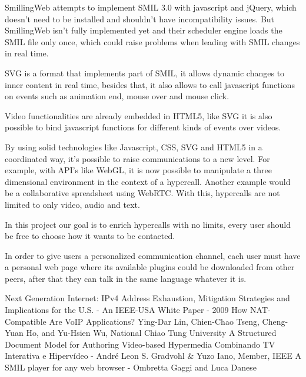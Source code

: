 \documentclass[11pt,twocolumn]{article}
\begin{document}
  SmillingWeb attempts to implement SMIL 3.0 with javascript and jQuery, which doesn't need to be installed and shouldn't have incompatibility issues. But SmillingWeb isn't fully implemented yet and their scheduler engine loads the SMIL file only once, which could raise problems when leading with SMIL changes in real time.  

  SVG is a format that implements part of SMIL, it allows dynamic changes to inner content in real time, besides that, it also allows to call javascript functions on events such as animation end, mouse over and mouse click.

  Video functionalities are already embedded in HTML5, like SVG it is also possible to bind javascript functions for different kinds of events over videos.

  By using solid technologies like Javascript, CSS, SVG and HTML5 in a coordinated way, it's possible to raise communications to a new level. For example, with API's like WebGL, it is now possible to manipulate a three dimensional environment in the context of a hypercall. Another example would be a collaborative spreadsheet using WebRTC. With this, hypercalls are not limited to only video, audio and text.

  In this project our goal is to enrich hypercalls with no limits, every user should be free to choose how it wants to be contacted.

  In order to give users a personalized communication channel, each user must have a personal web page where its available plugins could be downloaded from other peers, after that they can talk in the same language whatever it is.




\begin{thebibliography}{9}


 Next Generation Internet: IPv4 Address Exhaustion, Mitigation Strategies and Implications for the U.S. - An IEEE-USA White Paper - 2009
 How NAT-Compatible Are VoIP Applications? Ying-Dar Lin, Chien-Chao Tseng, Cheng-Yuan Ho, and Yu-Hsien Wu, National Chiao Tung University
 A Structured Document Model for Authoring Video-based Hypermedia
 Combinando TV Interativa e Hipervídeo - André Leon S. Gradvohl & Yuzo Iano, Member, IEEE
 A SMIL player for any web browser - Ombretta Gaggi and Luca Danese


\end{thebibliography}
\end{document}
